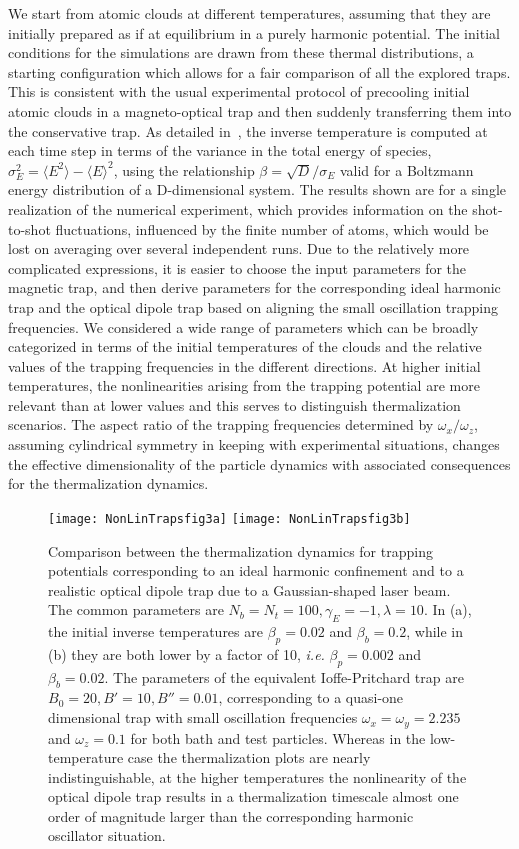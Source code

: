 \documentclass[pra,letterpaper,onecolumn,superscriptaddress,floatfix]{revtex4}
\begin{document}
We start from atomic clouds at different temperatures, assuming that they are initially prepared as if at equilibrium
in a purely harmonic potential. The initial conditions for the simulations are drawn from these thermal distributions, a
starting configuration which allows for a fair comparison of all the explored traps. This is consistent with the usual
experimental protocol of precooling initial atomic clouds in a magneto-optical trap and then suddenly transferring them
into the conservative trap. As detailed in~\cite{JauOnoSun}, the inverse temperature is computed
at each time step in terms of the variance in the total energy of species, $\sigma_E^2=\langle E^2 \rangle
-\langle E \rangle^2$, using the relationship $\beta=\sqrt{D}/\sigma_E$ valid for a Boltzmann energy distribution
of a D-dimensional system. The results shown are for a single realization of the numerical experiment, which provides
information on the shot-to-shot fluctuations, influenced by the finite number of atoms,  which would be
lost on averaging over several independent runs.
Due to the relatively more complicated expressions, it is easier to choose the input parameters 
for the magnetic trap, and then derive parameters for the corresponding ideal harmonic trap and the optical 
dipole trap based on aligning the small oscillation trapping frequencies. 
We considered a wide range of parameters which can be broadly categorized in terms of the initial temperatures 
of the clouds and the relative values of the trapping frequencies in the different directions. 
At higher initial temperatures, the nonlinearities arising from the trapping potential are more relevant 
than at lower values and this serves to distinguish thermalization scenarios. The aspect ratio of the trapping 
frequencies determined by $\omega_x/\omega_z$, assuming cylindrical symmetry in keeping with experimental situations, 
changes the effective dimensionality of the particle dynamics with associated consequences for the thermalization dynamics.

\begin{figure}[t]
\texttt{[image: NonLinTrapsfig3a]} 
\texttt{[image: NonLinTrapsfig3b]}
\caption{Comparison between the thermalization dynamics for trapping potentials corresponding to an 
ideal harmonic confinement and to a realistic optical dipole trap due to a Gaussian-shaped laser beam. 
The common parameters are $N_b=N_t=100, \gamma_E=-1, \lambda=10$. In (a), the initial inverse temperatures are 
$\beta_p=0.02$ and $\beta_b=0.2$, while in (b) they are both lower by a factor of 10, {\it i.e.} $\beta_p=0.002$ and 
$\beta_b=0.02$. The parameters of the equivalent Ioffe-Pritchard trap are $B_0=20, B'=10, B''=0.01$, corresponding 
to a quasi-one dimensional trap with small oscillation frequencies $\omega_x=\omega_y=2.235$ and $\omega_z=0.1$ for 
both bath and test particles. Whereas in the low-temperature case the thermalization plots are nearly 
indistinguishable, at the higher temperatures the nonlinearity of the optical dipole trap results in 
a thermalization timescale almost one order of magnitude larger than the corresponding harmonic oscillator 
situation.} 
\label{Fig3}
\end{figure}
\end{document}
